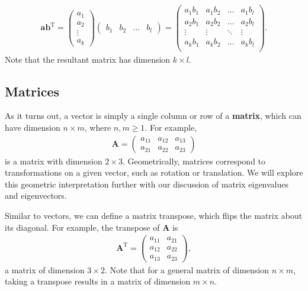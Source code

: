 \documentclass[11pt]{article} %
\begin{document}
\begin{align}
    \textbf{a}\textbf{b}^\text{T}=
    \begin{pmatrix}
        a_1 \\
        a_2 \\
        \vdots \\
        a_k
    \end{pmatrix}
    \begin{pmatrix}
        b_1 & b_2 & \hdots & b_l
    \end{pmatrix}=
    \begin{pmatrix}
        a_1b_1 & a_1b_2 & \hdots & a_1b_l \\
        a_2b_1 & a_2b_2 & \hdots & a_2b_l \\
        \vdots & \vdots & \ddots & \vdots \\
        a_kb_1 & a_kb_2 & \hdots & a_kb_l \\
    \end{pmatrix}. \nonumber
\end{align}
Note that the resultant matrix has dimension $k \times l$.



\subsection{Matrices}
As it turns out, a vector is simply a single column or row of a \textbf{matrix}, which can have dimension $n \times m$, where $n,m\geq1$. For example,  
\begin{align}
    \textbf{A} =
    \begin{pmatrix}
        a_{11} & a_{12} & a_{13}\\
        a_{21} & a_{22} & a_{23}
    \end{pmatrix} \nonumber
\end{align}
is a matrix with dimension $2\times 3$. Geometrically, matrices correspond to transformations on a given vector, such as rotation or translation. We will explore this geometric interpretation further with our discussion of matrix eigenvalues and eigenvectors.

Similar to vectors, we can define a matrix transpose, which flips the matrix about its diagonal. For example, the transpose of $\mathbf{A}$ is  
\begin{align}
    \textbf{A}^\text{T} =
    \begin{pmatrix}
        a_{11} & a_{21} \\
        a_{12} & a_{22} \\
        a_{13} & a_{23}
    \end{pmatrix}, \nonumber
\end{align}
a matrix of dimension $3 \times 2$. Note that for a general matrix of dimension $n \times m$, taking a transpose results in a matrix of dimension $m \times n$.
\end{document}
